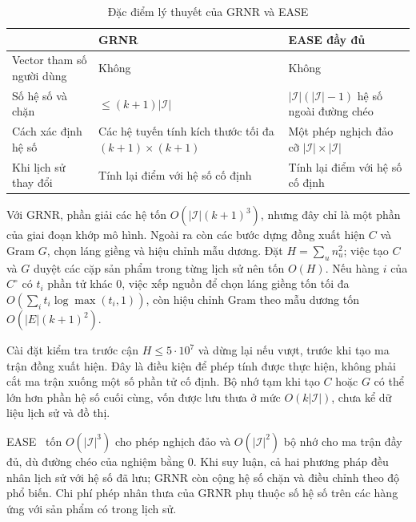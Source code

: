 \begin{table}[H]
\centering
\small
\begin{tabularx}{\textwidth}{@{}p{3cm}>{\raggedright\arraybackslash}X>{\raggedright\arraybackslash}X@{}}
\toprule
 & GRNR & EASE đầy đủ \\
\midrule
Vector tham số người dùng & Không & Không \\
Số hệ số và chặn & $\le(k+1)|\mathcal{I}|$ & $|\mathcal{I}|(|\mathcal{I}|-1)$ hệ số ngoài đường chéo \\
Cách xác định hệ số & Các hệ tuyến tính kích thước tối đa $(k+1)\times(k+1)$ & Một phép nghịch đảo cỡ $|\mathcal{I}|\times|\mathcal{I}|$ \\
Khi lịch sử thay đổi & Tính lại điểm với hệ số cố định & Tính lại điểm với hệ số cố định \\
\bottomrule
\end{tabularx}
\caption{Đặc điểm lý thuyết của GRNR và EASE}
\label{tab:complexity}
\end{table}

Với GRNR, phần giải các hệ tốn $O(|\mathcal{I}|(k+1)^3)$, nhưng đây chỉ là một phần của giai đoạn khớp mô hình. Ngoài ra còn các bước dựng đồng xuất hiện $C$ và Gram $G$, chọn láng giềng và hiệu chỉnh mẫu dương. Đặt $H=\sum_u n_u^2$; việc tạo $C$ và $G$ duyệt các cặp sản phẩm trong từng lịch sử nên tốn $O(H)$. Nếu hàng $i$ của $C^\circ$ có $t_i$ phần tử khác 0, việc xếp nguồn để chọn láng giềng tốn tối đa $O(\sum_i t_i\log\max(t_i,1))$, còn hiệu chỉnh Gram theo mẫu dương tốn $O(|E|(k+1)^2)$.

Cài đặt kiểm tra trước cận $H\le5\cdot10^7$ và dừng lại nếu vượt, trước khi tạo ma trận đồng xuất hiện. Đây là điều kiện để phép tính được thực hiện, không phải cắt ma trận xuống một số phần tử cố định. Bộ nhớ tạm khi tạo $C$ hoặc $G$ có thể lớn hơn phần hệ số cuối cùng, vốn được lưu thưa ở mức $O(k|\mathcal{I}|)$, chưa kể dữ liệu lịch sử và đồ thị.

EASE~\cite{steck2019ease} tốn $O(|\mathcal{I}|^3)$ cho phép nghịch đảo và $O(|\mathcal{I}|^2)$ bộ nhớ cho ma trận đầy đủ, dù đường chéo của nghiệm bằng 0. Khi suy luận, cả hai phương pháp đều nhân lịch sử với hệ số đã lưu; GRNR còn cộng hệ số chặn và điều chỉnh theo độ phổ biến. Chi phí phép nhân thưa của GRNR phụ thuộc số hệ số trên các hàng ứng với sản phẩm có trong lịch sử.

